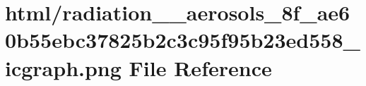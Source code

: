 \hypertarget{radiation____aerosols__8f__ae60b55ebc37825b2c3c95f95b23ed558__icgraph_8png}{}\section{html/radiation\+\_\+\+\_\+aerosols\+\_\+8f\+\_\+ae60b55ebc37825b2c3c95f95b23ed558\+\_\+icgraph.png File Reference}
\label{radiation____aerosols__8f__ae60b55ebc37825b2c3c95f95b23ed558__icgraph_8png}
